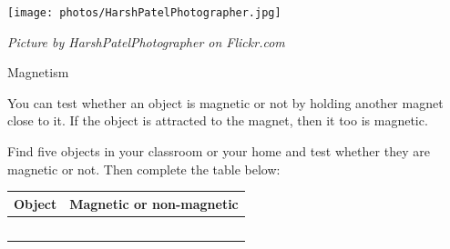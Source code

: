 \begin{minipage}{.5\textwidth}
\begin{center}
 \texttt{[image: photos/HarshPatelPhotographer.jpg]}\par
\textit{Picture by HarshPatelPhotographer on Flickr.com}
\end{center}
\end{minipage}\pagebreak
\label{m38706*secfhsst!!!underscore!!!id575}
            \begin{Investigation}{Magnetism}{
            \nopagebreak
      \label{m38706*id67220}You can test whether an object is magnetic or not by holding another magnet close to it. If the object is attracted to the magnet, then it too is magnetic.\par 
      \label{m38706*id67227}Find five objects in your classroom or your home and test whether they are magnetic or not. Then complete the table below:\par 
          \begin{table}[H]
        \begin{center}
      \label{m38706*id67234}
    \noindent
      \begin{tabular}{|l|l|}\hline
                \textbf{Object}
               &
                \textbf{Magnetic or non-magnetic} \\ \hline
         & \\ \hline
         & \\ \hline
         & \\ \hline
         & \\ \hline
         & \\ \hline
    \end{tabular}
      \end{center}
\end{table}}

\end{Investigation}
    \par
\label{m38706*secfhsst!!!underscore!!!id616}
